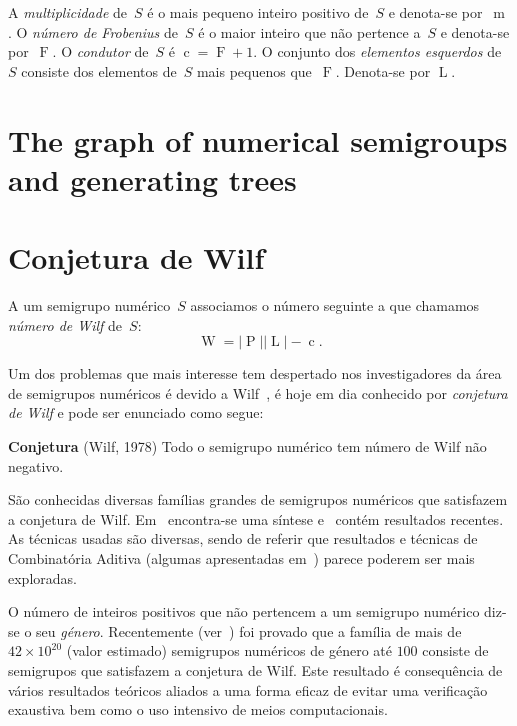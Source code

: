 \documentclass[12pt]{amsart}
\numberwithin{table}{section}
\numberwithin{figure}{section}
\numberwithin{equation}{section}
\DeclareMathOperator{\wilfoper}{W} %
\DeclareMathOperator{\Frobeniusoper}{F} %
\DeclareMathOperator{\conductoroper}{c} %
\DeclareMathOperator{\multiplicityoper}{m} %
\DeclareMathOperator{\leftsoper}{L} %
\DeclareMathOperator{\primitivesoper}{P} %
\newtheorem{conjecture}[theorem]{Conjecture}
\theoremstyle{definition}
\theoremstyle{remark}
\begin{document}
A \emph{multiplicidade} de~\(S\) é o mais pequeno inteiro positivo de~\(S\) e denota-se por~\(\multiplicityoper\).
O \emph{número de Frobenius} de~\(S\) é o maior inteiro que não pertence a~\(S\) e denota-se por~\(\Frobeniusoper\).
O \emph{condutor} de~\(S\) é \(\conductoroper=\Frobeniusoper +1\).
%
O conjunto dos \emph{elementos esquerdos} de~\(S\) consiste dos elementos de~\(S\) mais pequenos que~\(\Frobeniusoper\). Denota-se por \(\leftsoper\).


\section{The graph of numerical semigroups and generating trees}\label{sec:NSgraph}



\section{Conjetura de Wilf}\label{sec:Wilf}
  	A um semigrupo numérico~\(S\) associamos o número seguinte a que chamamos \emph{número de Wilf} de~\(S\):
\begin{equation*}\label{eq:wilf-number}
\wilfoper = \lvert \primitivesoper \rvert\lvert \leftsoper \rvert-\conductoroper.
\end{equation*}


Um dos problemas que mais interesse tem despertado nos investigadores da área de semigrupos numéricos é devido a Wilf~\cite[Problem~(a)]{Wilf1978AMM-circle}, é hoje em dia conhecido por \emph{conjetura de Wilf} e pode ser enunciado como segue:
\smallskip

\textbf{Conjetura} (Wilf, 1978) Todo o semigrupo numérico tem número de Wilf não negativo.
\smallskip

São conhecidas diversas famílias grandes de semigrupos numéricos que satisfazem a conjetura de Wilf. Em~\cite{Delgado2020-survey} encontra-se uma síntese e~\cite{DelgadoKumarMarion2025pp-counting} contém resultados recentes.
As técnicas usadas são diversas, sendo de referir que resultados e técnicas de Combinatória Aditiva (algumas apresentadas em~\cite{TaoVu2006Book-Additive}) parece poderem ser mais exploradas.

O número de inteiros positivos que não pertencem a um semigrupo numérico diz-se o seu \emph{género}. 
Recentemente (ver~\cite{DelgadoEliahouFromentin2025JoA-verification}) foi provado que a família de mais de \(42\times 10^{20}\) (valor estimado) semigrupos numéricos de género até \(100\) consiste de semigrupos que satisfazem a conjetura de Wilf. Este resultado é consequência de vários resultados teóricos aliados a uma forma eficaz de evitar uma verificação exaustiva bem como o uso intensivo de meios computacionais. 
\end{document}
